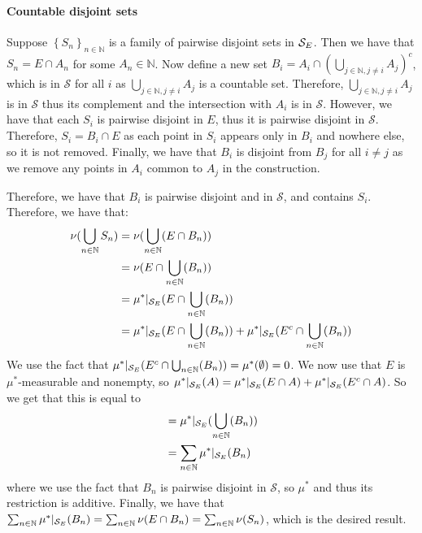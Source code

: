 \documentclass{article}
\theoremstyle{definition}
\numberwithin{theorem}{section}
\numberwithin{equation}{section}
\newcommand{\sig}{\mathcal{S}}
\begin{document}
\paragraph{Countable disjoint sets}
Suppose $\left\lbrace S_n \right\rbrace_{n \in \mathbb{N}}$ is a family of pairwise disjoint sets in $\mathcal{S}_E$. Then we have that $S_n = E \cap A_n$ for some $A_n \in \mathbb{N}$. Now define a new set $B_i = A_i \cap (\bigcup_{j \in \mathbb{N}, j \neq i} A_j)^c$, which is in $\sig$ for all $i$ as $\bigcup_{j \in \mathbb{N}, j \neq i} A_j$ is a countable set. Therefore, $\bigcup_{j \in \mathbb{N}, j \neq i} A_j$ is in $\sig$ thus its complement and the intersection with $A_i$ is in $\sig$. However, we have that each $S_i$ is pairwise disjoint in $E$, thus it is pairwise disjoint in $\sig$. Therefore, $S_i = B_i \cap E$ as each point in $S_i$ appears only in $B_i$ and nowhere else, so it is not removed. Finally, we have that $B_i$ is disjoint from $B_j$ for all $i \neq j$ as we remove any points in $A_i$ common to $A_j$ in the construction. 
\par
Therefore, we have that $B_i$ is pairwise disjoint and in $\sig$, and contains $S_i$. Therefore, we have that:
\begin{align*}
	\nu(\bigcup_{n \in \mathbb{N}} S_n) &= \nu(\bigcup_{n \in \mathbb{N}}(E \cap B_n))\\
	&= \nu(E \cap \bigcup_{n \in \mathbb{N}}( B_n))\\
	&= \mu^*|_{\mathcal{S}_E}(E \cap \bigcup_{n \in \mathbb{N}}( B_n))\\
	&= \mu^*|_{\mathcal{S}_E}(E \cap \bigcup_{n \in \mathbb{N}}( B_n)) + \mu^*|_{\mathcal{S}_E}(E^c \cap \bigcup_{n \in \mathbb{N}}( B_n))
\end{align*}
We use the fact that $\mu^*|_{\mathcal{S}_E}(E^c \cap \bigcup_{n \in \mathbb{N}}( B_n)) =  \mu^*(\emptyset) = 0$. We now use that $E$ is $\mu^*$-measurable and nonempty, so $\mu^*|_{\mathcal{S}_E}(A) = \mu^*|_{\mathcal{S}_E}(E \cap A) + \mu^*|_{\mathcal{S}_E}(E^c \cap A)$. So we get that this is equal to 
\begin{align*}
	&= \mu^*|_{\mathcal{S}_E}(\bigcup_{n \in \mathbb{N}}( B_n))\\
	&= \sum_{n \in \mathbb{N}} \mu^*|_{\mathcal{S}_E}(B_n)
\end{align*}
where we use the fact that $B_n$ is pairwise disjoint in $\sig$, so $\mu^*$ and thus its restriction is additive. Finally, we have that $\sum_{n \in \mathbb{N}} \mu^*|_{\mathcal{S}_E}(B_n) = \sum_{n \in \mathbb{N}}\nu (E \cap B_n) = \sum_{n \in \mathbb{N}}\nu(S_n)$, which is the desired result. 
\end{document}
